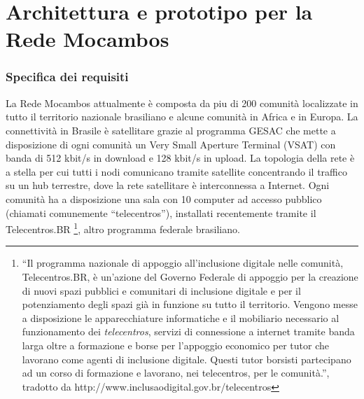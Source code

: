 
\chapter{Architettura e prototipo per la Rede Mocambos
} %
\label{Capitolo3}

\subsection{Specifica dei requisiti}

La Rede Mocambos attualmente è composta da piu di 200 comunità
localizzate in tutto il territorio nazionale brasiliano e alcune
comunità in Africa e in Europa. La connettività in Brasile è
satellitare grazie al programma GESAC che mette a disposizione di ogni
comunità un Very Small Aperture Terminal (VSAT) con banda di 512
kbit/s in download e 128 kbit/s in upload. La topologia della rete è a
stella per cui tutti i nodi comunicano tramite satellite concentrando
il traffico su un hub terrestre, dove la rete satellitare è
interconnessa a Internet. Ogni comunità ha a disposizione una sala con
10 computer ad accesso pubblico (chiamati comunemente
``telecentros''), installati recentemente tramite il Telecentros.BR
\footnote{``Il programma nazionale di appoggio all'inclusione digitale
nelle comunità, Telecentros.BR, è un'azione del Governo Federale di
appoggio per la creazione di nuovi spazi pubblici e comunitari di
inclusione digitale e per il potenziamento degli spazi già in funzione
su tutto il territorio. Vengono messe a disposizione le
apparecchiature informatiche e il mobiliario necessario al
funzionamento dei \textit{telecentros}, servizi di connessione a
internet tramite banda larga oltre a formazione e borse per l'appoggio
economico per tutor che lavorano come agenti di inclusione
digitale. Questi tutor borsisti partecipano ad un corso di formazione
e lavorano, nei telecentros, per le comunità.'', tradotto da
http://www.inclusaodigital.gov.br/telecentros}, altro programma
federale brasiliano.

